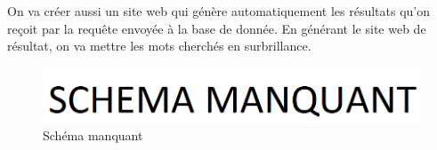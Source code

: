 On va créer aussi un site web qui génère automatiquement les résultats qu'on reçoit par la requête envoyée à la base de donnée. En générant le site web de résultat, on va mettre les mots cherchés en surbrillance. 

    \begin{figure}[H]
        \centering
        \includegraphics[width=\textwidth]{figures/manquant.png}
            \caption{Schéma manquant}
            \label{fig:manquant}
    \end{figure}
